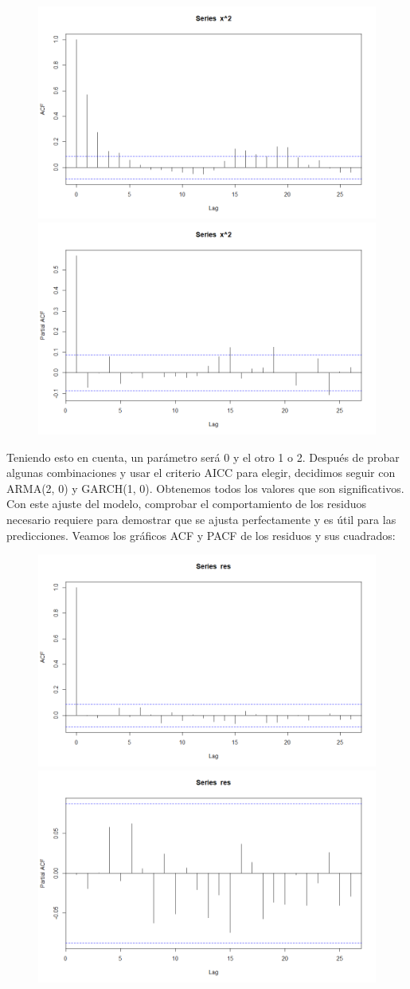 \documentclass[a4paper,]{article}
\begin{document}
\begin{figure}[H]
    \centering \includegraphics[width=0.49\linewidth]{ACFX^2.png}
    \includegraphics[width=0.49\linewidth]{PACFX^2.png}
\end{figure}

Teniendo esto en cuenta, un parámetro será 0 y el otro 1 o 2.
Después de probar algunas combinaciones y usar el criterio AICC para elegir, decidimos seguir con ARMA(2, 0) y
GARCH(1, 0). Obtenemos todos los valores que son significativos. Con este ajuste del modelo, comprobar el comportamiento de los residuos necesario requiere para demostrar que se ajusta perfectamente y es útil para las predicciones. Veamos los gráficos ACF y PACF de los
residuos y sus cuadrados:

\begin{figure}[H]
    \centering \includegraphics[width=0.49\linewidth]{Res-ACF.png}
    \includegraphics[width=0.49\linewidth]{Res-PACF.png}
\end{figure}
\end{document}
